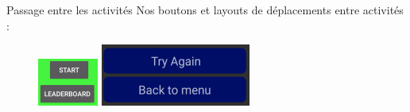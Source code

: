 \documentclass{beamer}
\begin{document}
\begin{frame}{Passage entre les activités}
    Nos boutons et layouts de déplacements entre activités :
    \begin{figure}
    \begin{minipage}[H]{0.5\linewidth}
        \centering
        \includegraphics[scale=0.9]{ButtonsChangeActi.png}
    \end{minipage}\hfill
    \begin{minipage}[H]{0.5\linewidth}
        \centering
        \includegraphics[scale=0.7]{LayoutChangeActi.png}
    \end{minipage}
    \end{figure}
\end{frame}
%
%
\end{document}
